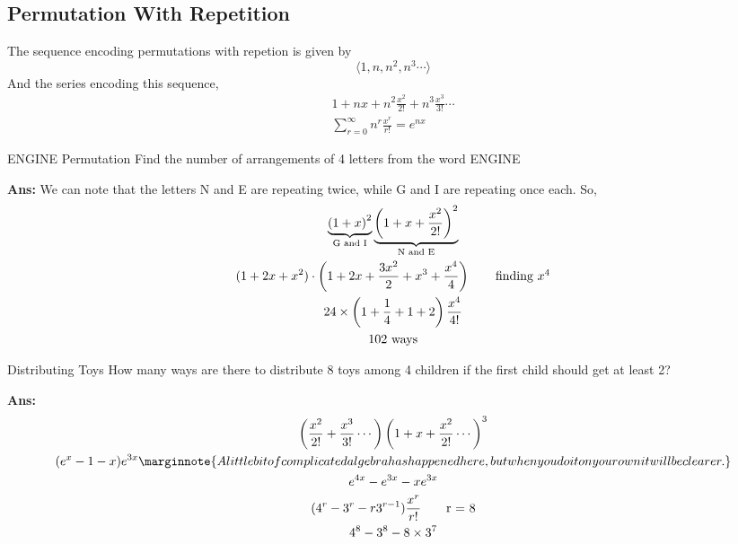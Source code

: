 \subsection{Permutation With Repetition}
The sequence encoding permutations with repetion is given by
\begin{equation*}
    \langle 1,n,n^2,n^3 \cdots\rangle
\end{equation*}
And the series encoding this sequence,
\begin{gather*}
    1 + nx + n^2\frac{x^2}{2!} + n^3 \frac{x^3}{3!} \cdots \\
    \sum_{r = 0}^{\infty} n^r \frac{x^r}{r!} = e^{nx}
\end{gather*}

\begin{exampletcb}{ENGINE Permutation}{}
    Find the number of arrangements of 4 letters from the word ENGINE

    \textbf{Ans:} We can note that the letters N and E are repeating twice, while G and I are repeating once each. So,
    \begin{gather*}
        \underbrace{{(1 + x)}^2}_{\text{G and I}} \underbrace{{\left(1 + x + \frac{x^2}{2!}\right)}^2}_{\text{N and E}}\\
        (1 + 2x + x^2) \cdot \left(1 + 2x + \frac{3x^2}{2} + x^3 + \frac{x^4}{4}\right) \tag*{finding \mbox{\(x^4\)}} \\
        24 \times \left(1 +\frac{1}{4} + 1 + 2\right) \frac{x^4}{4!}\\
        102 \text{ ways}
    \end{gather*}
\end{exampletcb}

\begin{exampletcb}{Distributing Toys}{}
    How many ways are there to distribute 8 toys among 4 children if the first child should get at least 2?

    \textbf{Ans:} \begin{gather*}
        \left(\frac{x^2}{2!} + \frac{x^3}{3!}\cdots\right) {\left(1 + x + \frac{x^2}{2!}\cdots\right)}^3\\
        (e^x - 1 - x) e^{3x} \marginnote{A little bit of complicated algebra has happened here, but when you do it on your own it will be clearer.}\\
        e^{4x} - e^{3x} - xe^{3x} \\
        ( 4^r - 3^r - r3^{r - 1} )\frac{x^r}{r!} \tag*{r = 8} \\
        4^8 - 3^8 - 8 \times 3^7
    \end{gather*}
\end{exampletcb}


